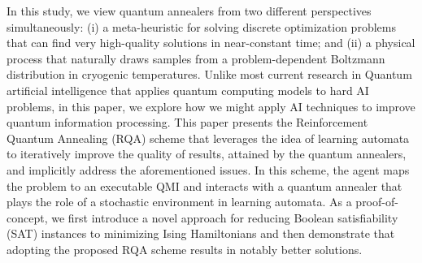 \documentclass[fleqn,10pt]{wlscirep}
\begin{document}
In this study, we view quantum annealers from two different perspectives simultaneously: (i) a meta-heuristic for solving discrete optimization problems that can find very high-quality solutions in near-constant time; and (ii) a physical process that naturally draws samples from a problem-dependent Boltzmann distribution in cryogenic temperatures. Unlike most current research in Quantum artificial intelligence that applies quantum computing models to hard AI problems, in  this paper, we explore how we might apply AI techniques to improve quantum information processing. 
This paper presents the Reinforcement Quantum Annealing (RQA) scheme that leverages the idea of learning automata \cite{narendra2012learning} to iteratively improve the quality of results, attained by the quantum annealers, and implicitly address the aforementioned issues. In this scheme, the agent maps the problem to an executable QMI and interacts with a quantum annealer that plays the role of a stochastic environment in learning automata. As a proof-of-concept, we first introduce a novel approach for reducing Boolean satisfiability (SAT) instances \cite{biere2009handbook} to minimizing Ising Hamiltonians and then demonstrate that adopting the proposed RQA scheme results in notably better solutions.
\end{document}
